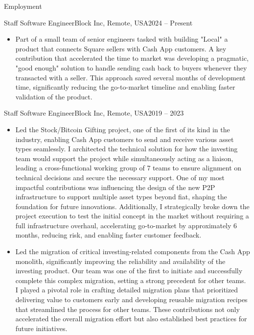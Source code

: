 \documentclass[includefoot]{mcdowellcv}
\begin{document}
	\makeheader
	\begin{cvsection}{Employment}
		\begin{cvsubsection}{Staff Software Engineer}{Block Inc, Remote, USA}{2024 -- Present}
			\begin{itemize}
				\item Part of a small team of senior engineers tasked with building "Local" a product that connects Square sellers with Cash App customers. A key contribution that accelerated the time to market was developing a pragmatic, "good enough" solution to handle sending cash back to buyers whenever they transacted with a seller. This approach saved several months of development time, significantly reducing the go-to-market timeline and enabling faster validation of the product. 
			\end{itemize}
		\end{cvsubsection}
		\begin{cvsubsection}{Staff Software Engineer}{Block Inc, Remote, USA}{2019 -- 2023}
			\begin{itemize}
				\item Led the Stock/Bitcoin Gifting project, one of the first of its kind in the industry, enabling Cash App customers to send and receive various asset types seamlessly. I architected the technical solution for how the investing team would support the project while simultaneously acting as a liaison, leading a cross-functional working group of 7 teams to ensure alignment on technical decisions and secure the necessary support. One of my most impactful contributions was influencing the design of the new P2P infrastructure to support multiple asset types beyond fiat, shaping the foundation for future innovations. Additionally, I strategically broke down the project execution to test the initial concept in the market without requiring a full infrastructure overhaul, accelerating go-to-market by approximately 6 months, reducing risk, and enabling faster customer feedback.
				\item Led the migration of critical investing-related components from the Cash App monolith, significantly improving the reliability and availability of the investing product. Our team was one of the first to initiate and successfully complete this complex migration, setting a strong precedent for other teams. I played a pivotal role in crafting detailed migration plans that prioritized delivering value to customers early and developing reusable migration recipes that streamlined the process for other teams. These contributions not only accelerated the overall migration effort but also established best practices for future initiatives.

\end{itemize}
\end{cvsubsection}
\end{cvsection}
\end{document}
